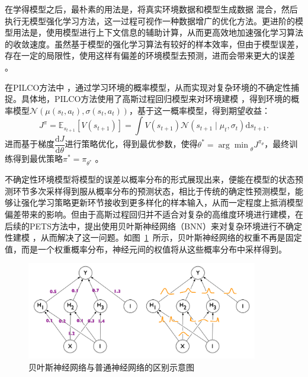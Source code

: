 在学得模型之后，最朴素的用法是，将真实环境数据和模型生成数据 混合，然后执行无模型强化学习方法，这一过程可视作一种数据增广的优化方法。更进阶的模型用法是，使用模型进行上下文信息的辅助计算，从而更高效地加速强化学习算法的收敛速度。虽然基于模型的强化学习算法有较好的样本效率，但由于模型误差，存在一定的局限性，使用这样有偏差的环境模型去预测，进而会带来更大的误差 \cite{zambaldi2018deep}。

在PILCO方法中 \cite{deisenroth2011pilco}，通过学习环境的概率模型，从而实现对复杂环境的不确定性捕捉。具体地，PILCO方法使用了高斯过程回归模型来对环境建模 \cite{quinonero2005unifying}，得到环境的概率模型$\mathcal{N}\left(\mu(s_t,a_t), \sigma(s_t,a_t)\right)$，基于这一概率模型，得到期望收益：
\begin{equation}
    J^\pi=\mathbb{E}_{s_{t+1}}\left[V\left(s_{t+1}\right)\right]=\int V\left(s_{t+1}\right) \mathcal{N}\left(s_{t+1} \mid \mu_t, \sigma_t\right) \mathrm{d} s_{t+1}.
\end{equation}
进而基于梯度$\dfrac{\mathrm{d}J}{\mathrm{d}\theta}$进行策略优化，得到最优参数，使得$\theta^* = {\arg\min}_\theta J^{\pi_\theta}$，最终训练得到最优策略$\pi^*=\pi_{\theta^*}$ 。\cite{peters2006policy}

不确定性环境模型将模型的误差以概率分布的形式展现出来，便能在模型的状态预测环节多次采样得到服从概率分布的预测状态，相比于传统的确定性预测模型，能够让强化学习策略更新环节接收到更多样化的样本输入，从而一定程度上抵消模型偏差带来的影响。但由于高斯过程回归并不适合对复杂的高维度环境进行建模，在后续的PETS方法\cite{Chua2018DeepModels}中，提出使用贝叶斯神经网络（BNN）来对复杂环境进行不确定性建模 \cite{Blundell2015WeightNetworks}，从而解决了这一问题。如图~\ref{fig:BNN}~所示，贝叶斯神经网络的权重不再是固定值，而是一个权重概率分布，神经元间的权值将从这些概率分布中采样得到。

\begin{figure}[tbh]
\centering
\includegraphics[width=0.9\textwidth]{figures/BNN.png}
\caption{贝叶斯神经网络与普通神经网络的区别示意图}
\label{fig:BNN}
\end{figure}

